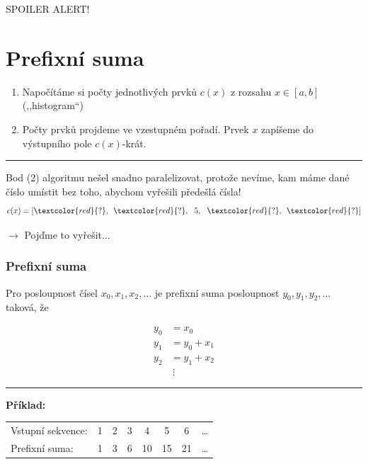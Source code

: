 \documentclass[usenames,dvipsnames,9pt]{beamer}
\begin{document}
{\begin{frame}[standout]
	\LARGE \faWarning \hspace{2pt} SPOILER ALERT!
\end{frame}

\section{Prefixní suma}

\begin{frame}[fragile]
	\begin{enumerate}
		\item Napočítáme si počty jednotlivých prvků $c(x)$ z rozsahu $x\in[a,b]$ (,,histogram``)
		\item Počty prvků projdeme ve vzestupném pořadí. Prvek $x$ zapíšeme do výstupního pole $c(x)$-krát.
	\end{enumerate}

	\vspace{1em}\hrule\vspace{1em}

	\begin{center}
		\large Bod (2) algoritmu nešel snadno paralelizovat, protože nevíme, kam máme dané číslo umístit bez toho, abychom vyřešili předešlá čísla!
		\[ c(x) = [ \textcolor{red}{?}, \ \, \textcolor{red}{?},\ \ 5,\ \ \textcolor{red}{?}, \ \, \textcolor{red}{?}] \]
	\end{center}

	\hfill $\rightarrow$ Pojďme to vyřešit...
\end{frame}

\begin{frame}
\frametitle{Prefixní suma}

Pro posloupnost čísel $x_0, x_1, x_2, \dots$ je prefixní suma posloupnost $y_0, y_1, y_2, \dots$ taková, že

\begin{align*}
y_0 &= x_0 \\
y_1 & = y_0 + x_1\\
y_2 & = y_1 + x_2\\
&~\vdots
\end{align*}

\vspace{1em}\hrule\vspace{1em}

{\bf Příklad:}

\begin{tabular}{ l c c c c c c c }
  Vstupní sekvence: 	& 1 & 2 & 3 & 4 & 5 & 6 & \dots \\
  Prefixní suma:		& 1 & 3 & 6 & 10 & 15 & 21 & \dots  \\
\end{tabular}


\end{frame}}
\end{document}
